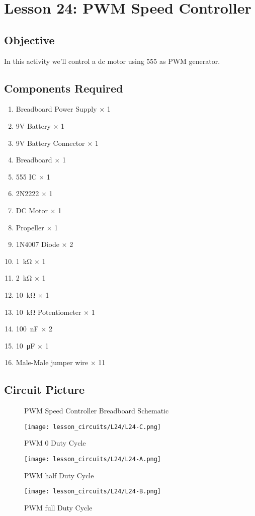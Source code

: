 \section{Lesson 24: PWM Speed Controller}
\subsection{Objective}
In this activity we'll control a dc motor using 555 as PWM generator.
\subsection{Components Required}
\begin{enumerate}
    \item Breadboard Power Supply $\times$ 1
    \item 9V Battery $\times$ 1
    \item 9V Battery Connector $\times$ 1
    \item Breadboard $\times$ 1
    \item 555 IC $\times$ 1
    \item 2N2222 $\times$ 1
    \item DC Motor $\times$ 1
    \item Propeller $\times$ 1
    \item 1N4007 Diode $\times$ 2
    \item \SI{1}{\kilo\ohm} $\times$ 1
    \item \SI{2}{\kilo\ohm} $\times$ 1
    \item \SI{10}{\kilo\ohm} $\times$ 1
    \item \SI{10}{\kilo\ohm} Potentiometer $\times$ 1
    \item \SI{100}{\nano\farad} $\times$ 2
    \item \SI{10}{\micro\farad} $\times$ 1
    \item Male-Male jumper wire $\times$ 11
\end{enumerate}
\subsection{Circuit Picture}
\begin{figure}[!hp]
    \centering
    \caption{PWM Speed Controller Breadboard Schematic}
    \label{fig:555_pwm_sch}
\end{figure}
\begin{figure}[!hp]
    \centering
    \texttt{[image: lesson\_circuits/L24/L24-C.png]}
    \caption{PWM 0 Duty Cycle}
    \label{fig:555_pwm_obb}
\end{figure}
\begin{figure}[!hp]
    \centering
    \texttt{[image: lesson\_circuits/L24/L24-A.png]}
    \caption{PWM half Duty Cycle}
    \label{fig:555_pwm_obb1}
\end{figure}
\begin{figure}[!hp]
    \centering
    \texttt{[image: lesson\_circuits/L24/L24-B.png]}
    \caption{PWM full Duty Cycle}
    \label{fig:555_pwm_obb2}
\end{figure}
